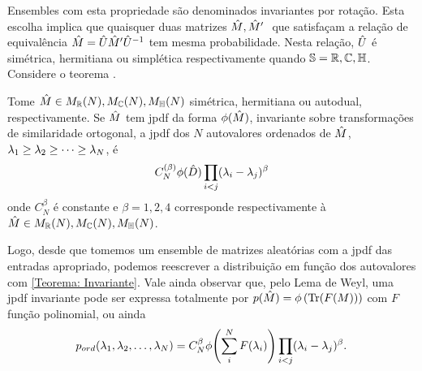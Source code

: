Ensembles com esta propriedade são denominados invariantes por rotação. Esta escolha implica que quaisquer duas matrizes $\hat M, \hat M'~$ que satisfaçam a relação de equivalência $\hat M = \hat U \hat M' \hat U^{-1}$ tem mesma probabilidade. Nesta relação, $\hat U$ é simétrica, hermitiana ou simplética respectivamente quando $\mathbb{S} = \mathbb{R},\mathbb{C},\mathbb{H} $. Considere o teorema \cite[Capítulo~3]{AlanThesis}.
\begin{thm}
	Tome $\hat M \in M_{\mathbb{R}}(N),  M_{\mathbb{C}}(N),  M_{\mathbb{H}}(N)$ simétrica, hermitiana ou autodual, respectivamente. Se  $\hat M$ tem jpdf da forma $\phi(\hat M)$, invariante sobre transformações de similaridade ortogonal, a jpdf dos $N$ autovalores ordenados de $\hat M$, $\lambda_1 \geq \lambda_2 \geq \dots \geq \lambda_N$, é $$ C_{N}^{(\beta)} \phi(\hat D) \prod_{i < j} (\lambda_i - \lambda_j)^{\beta}$$ onde $C_{N}^{\beta}$ é constante e $\beta = 1, 2, 4$ corresponde respectivamente à $\hat M \in M_{\mathbb{R}}(N),  M_{\mathbb{C}}(N),  M_{\mathbb{H}}(N)$. 
	\label{Teorema: Invariante}
\end{thm}

Logo, desde que tomemos um ensemble de matrizes aleatórias com a jpdf das entradas apropriado, podemos reescrever a distribuição em função dos autovalores com \ref{Teorema: Invariante}. Vale ainda observar que, pelo Lema de Weyl, uma jpdf invariante pode ser expressa totalmente por $p(\hat M)= \phi \left(\Tr(F(M)) \right)$ com $F$ função polinomial, ou ainda
\begin{equation}
	p_{ord}(\lambda_1, \lambda_2, \dots, \lambda_N) = C_{N}^{\beta} \phi{\left( \sum_i^N F(\lambda_i) \right)} \prod_{i < j} (\lambda_i - \lambda_j)^{\beta}.
	\label{Equation: p-ord}
\end{equation}


